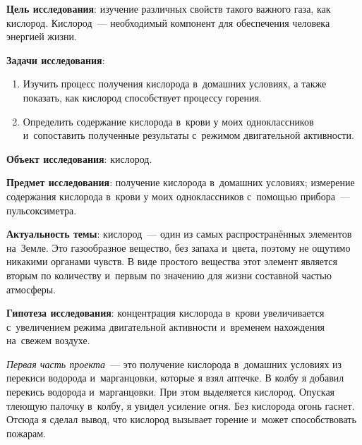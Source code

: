 \bigskip
{}



\makeProcTitleSchool


\textbf{Цель исследования}: изучение различных свойств такого важного газа, как кислород. Кислород~--- необходимый компонент для обеспечения человека энергией жизни.

\textbf{Задачи исследования}:
\begin{enumerate}[noitemsep]\vspace{-8pt}
\item Изучить процесс получения кислорода в~домашних условиях, а также показать, как кислород способствует процессу горения.
\item Определить содержание кислорода в~крови у моих одноклассников и~сопоставить полученные результаты с~режимом двигательной активности.
\end{enumerate}\vspace{-8pt}

\textbf{Объект исследования}: кислород.

\textbf{Предмет исследования}: получение кислорода в~домашних условиях; измерение содержания кислорода в~крови у моих одноклассников с~помощью прибора~--- пульсоксиметра.

\textbf{Актуальность темы}: кислород~--- один из самых распространённых элементов на~Земле. Это газообразное вещество, без запаха и~цвета, поэтому не ощутимо никакими органами чувств. В виде простого вещества этот элемент является вторым по количеству и~первым по значению для жизни составной частью атмосферы.

\textbf{Гипотеза исследования}: концентрация кислорода в~крови увеличивается с~увеличением режима двигательной активности и~временем нахождения на~свежем воздухе.

\textit{Первая часть проекта}~--- это получение кислорода в~домашних условиях из перекиси водорода и~марганцовки, которые я взял аптечке. В колбу я добавил перекись водорода и~марганцовки. При этом выделяется кислород. Опуская тлеющую палочку в~колбу, я увидел усиление огня. Без кислорода огонь гаснет. Отсюда я сделал вывод, что кислород вызывает горение и~может способствовать пожарам.

